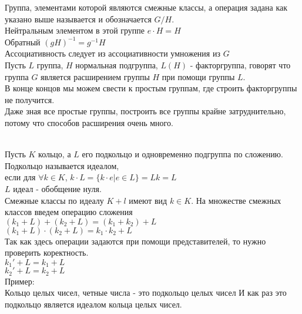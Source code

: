 \begin{defin}
	Группа, элементами которой являются смежные классы, а операция задана
	как указано выше называется  и обозначается $G/H$.\\
	Нейтральным элементом в этой группе $e\cdot H = H$\\
	Обратный $(gH)^{-1} = g^{-1}H$\\
	Ассоциативность следует из ассоциативности умножения из $G$\\

	Пусть $L$ группа, $H$ нормальная подгруппа, $L(H)$ - факторгруппа, говорят что
	группа $G$ является расширением группы $H$ при помощи группы $L$.\\
           В конце концов мы можем свести к простым группам, где строить факторгруппы 
           не получится.\\
	Даже зная все простые группы, построить все группы крайне затруднительно,
	потому что способов расширения очень много.
\end{defin}

\\

Пусть $K$ кольцо, а $L$ его подкольцо и одновременно подгруппа по сложению.\\
Подкольцо называется идеалом,\\
если для $\forall k \in K$,  $k\cdot L=\{k\cdot e |e\in L\} = Lk = L$\\
$L$ идеал - обобщение нуля.\\
Смежные классы по идеалу $K + l$ имеют вид $k\in K$. На множестве смежных классов введем
операцию сложения\\
$(k_1 + L) + (k_2 + L) = (k_1 + k_2)+ L$\\
$(k_1+L)\cdot(k_2+L) = k_1\cdot k_2 + L$\\
Так как здесь операции задаются при помощи представителей, то нужно проверить
коректность.\\
$k_1' + L = k_1 + L$\\
$k_2' + L = k_2 + L$\\

Пример:\\
Кольцо целых чисел, четные числа - это подкольцо целых чисел
И как раз это подкольцо является идеалом кольца целых чисел.